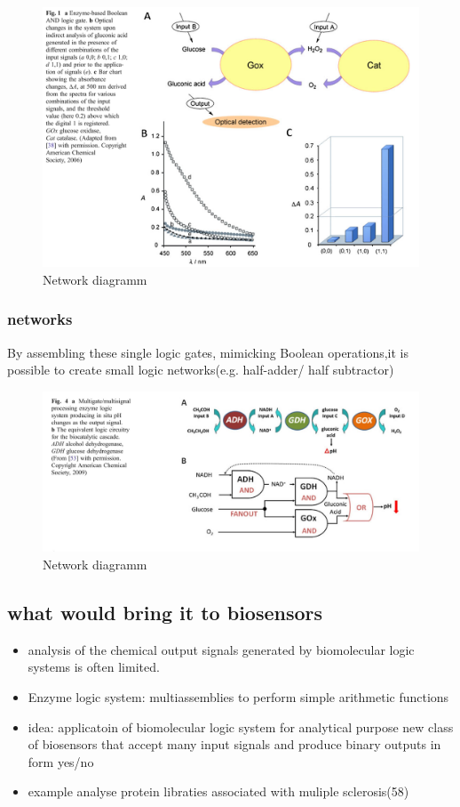 \documentclass[runningheads]{llncs}
\begin{document}
	\begin{figure} \centering \includegraphics[scale= 0.3]{AND.png} \caption{Network diagramm} \label{img:and} \end{figure}
	
	\subsubsection{networks}
	By assembling these single logic gates, mimicking Boolean operations,it is possible to create small logic networks(e.g. half-adder/ half subtractor)
	
	
	
	
	\begin{figure} \centering \includegraphics[scale= 0.2]{biocomputing_sensor.png} \caption{Network diagramm} \label{img:grafik-test} \end{figure}
	


\subsection{what would bring it to biosensors}	
	\begin{itemize}	
		\item analysis of the chemical output signals generated by biomolecular logic systems is often limited.
		\item Enzyme logic system: multiassemblies to perform simple arithmetic functions
		\item idea: applicatoin of biomolecular logic system for analytical purpose new class of biosensors that accept many input signals and produce binary outputs in form yes/no 
		\item example analyse protein libraties associated with muliple sclerosis(58)
	\end{itemize}
\end{document}
